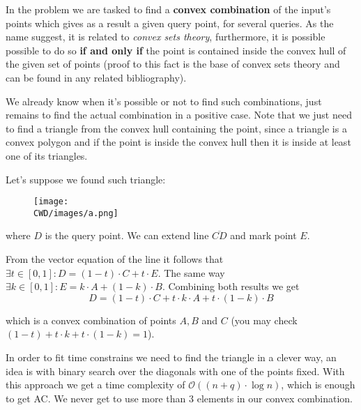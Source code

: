 % 


In the problem we are tasked to find a \textbf{convex combination} of the input's points which gives as a result a given query point, for several queries. As the name suggest, it is related to \textit{convex sets theory}, furthermore, it is possible possible to do so \textbf{if and only if} the point is contained inside the convex hull of the given set of points (proof to this fact is the base of convex sets theory and can be found in any related bibliography).

We already know when it's possible or not to find such combinations, just remains to find the actual combination in a positive case. Note that we just need to find a triangle from the convex hull containing the point, since a triangle is a convex polygon and if the point is inside the convex hull then it is inside at least one of its triangles.

Let's suppose we found such triangle:

\begin{figure}[!tbh]
	\centering
	\texttt{[image: \\CWD/images/a.png]}
\end{figure}

where $D$ is the query point. We can extend line $\overline{CD}$ and mark point $E$. 

From the vector equation of the line it follows that $\exists t \in [0, 1]: D = (1 - t) \cdot C + t \cdot E$. The same way $\exists k \in [0, 1]: E = k \cdot A + (1 - k) \cdot B$. Combining both results we get
	$$D = (1 - t) \cdot C + t \cdot k \cdot A + t \cdot (1 - k) \cdot B$$

which is a convex combination of points $A, B$ and $C$ \big(you may check $(1 - t) + t \cdot k + t \cdot (1 - k) = 1$\big).

In order to fit time constrains we need to find the triangle in a clever way, an idea is with binary search over the diagonals with one of the points fixed. With this approach we get a time complexity of $\mathcal{O}((n + q) \cdot \log n)$, which is enough to get AC. We never get to use more than $3$ elements in our convex combination.
